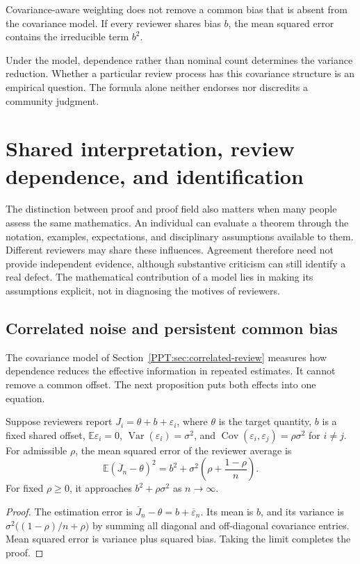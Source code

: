 \begin{PPTwarning}
\label{PPT:res:17:3}
Covariance-aware weighting does not remove a common bias that is absent from the covariance model. If every reviewer shares bias $b$, the mean squared error contains the irreducible term $b^2$.
\end{PPTwarning}

Under the model, dependence rather than nominal count determines the variance reduction. Whether a particular review process has this covariance structure is an empirical question. The formula alone neither endorses nor discredits a community judgment.


\section{Shared interpretation, review dependence, and identification}
\label{PPT:sec:old25}
\label{PPT:sec:interpretation}

The distinction between proof and proof field also matters when many people assess the same mathematics. An individual can evaluate a theorem through the notation, examples, expectations, and disciplinary assumptions available to them. Different reviewers may share these influences. Agreement therefore need not provide independent evidence, although substantive criticism can still identify a real defect. The mathematical contribution of a model lies in making its assumptions explicit, not in diagnosing the motives of reviewers.

\subsection{Correlated noise and persistent common bias}

The covariance model of Section~\ref{PPT:sec:correlated-review} measures how dependence reduces the effective information in repeated estimates. It cannot remove a common offset. The next proposition puts both effects into one equation.

\begin{PPTproposition}
\label{PPT:res:25:1}
Suppose reviewers report $J_i=\theta+b+\varepsilon_i$, where $\theta$ is the target quantity, $b$ is a fixed shared offset, $\mathbb E\varepsilon_i=0$, $\operatorname{Var}(\varepsilon_i)=\sigma^2$, and $\operatorname{Cov}(\varepsilon_i,\varepsilon_j)=\rho\sigma^2$ for $i\ne j$. For admissible $\rho$, the mean squared error of the reviewer average is
\[
\boxed{\mathbb E(\overline J_n-\theta)^2=b^2+\sigma^2\left(\rho+\frac{1-\rho}{n}\right).}
\]
For fixed $\rho\ge0$, it approaches $b^2+\rho\sigma^2$ as $n\to\infty$.
\end{PPTproposition}
\begin{proof}
The estimation error is $\overline J_n-\theta=b+\overline\varepsilon_n$. Its mean is $b$, and its variance is $\sigma^2\big((1-\rho)/n+\rho\big)$ by summing all diagonal and off-diagonal covariance entries. Mean squared error is variance plus squared bias. Taking the limit completes the proof.
\end{proof}

